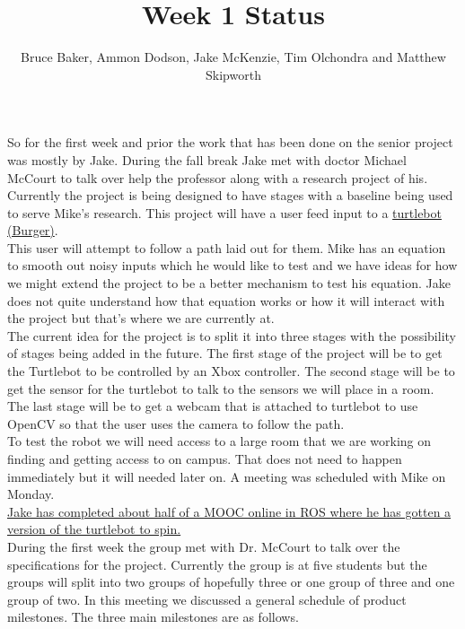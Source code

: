 \documentclass[12pt]{IEEEtran}
\begin{document}
\title{Week 1 Status}
\author{Bruce Baker, Ammon Dodson, Jake McKenzie, Tim Olchondra and Matthew Skipworth}
\maketitle

So for the first week and prior the work that has been done on the senior 
project was mostly by Jake. During the fall break Jake met with doctor 
Michael McCourt to talk over help the professor along with a research 
project of his. Currently the project is being designed to have stages with
a baseline being used to serve Mike's research. This project will have a user
feed input to a \href{http://wiki.ros.org/Robots/TurtleBot}{turtlebot (Burger)}.\\

\indent This user will attempt to follow a path laid out for them. Mike has an equation
to smooth out noisy inputs which he would like to test and we have ideas
for how we might extend the project to be a better mechanism to test his equation.
Jake does not quite understand how that equation works or how it will interact with
the project but that's where we are currently at.\\

\indent The current idea for the project is to split it into three stages with 
the possibility of stages being added in the future. The first stage of the
project will be to get the Turtlebot to be controlled by an Xbox controller.
The second stage will be to get the sensor for the turtlebot to talk to the sensors
we will place in a room. The last stage will be to get a webcam that is attached to
turtlebot to use OpenCV so that the user uses the camera to follow the path.\\

\indent To test the robot we will need access to a large room that we are working on finding 
and getting access to on campus. That does not need to happen immediately but it will needed 
later on. A meeting was scheduled with Mike on Monday. \\

\noindent \href{https://www.facebook.com/jake.mckenzie.16/videos/2450973201587222/}{Jake has completed 
about half of a MOOC online in ROS where he has gotten a version of
the turtlebot to spin.}\\

\indent During the first week the group met with Dr. McCourt to talk over the specifications 
for the project. Currently the group is at five students but the groups will split into
two groups of hopefully three or one group of three and one group of two. In this meeting 
we discussed a general schedule of product milestones. The three main milestones are 
as follows.
\end{document}

